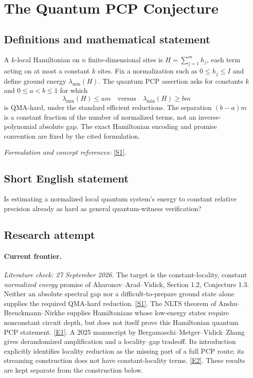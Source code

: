 \documentclass[11pt,a4paper]{article}
\newcommand{\sref}[2]{\hyperlink{source:#1:#2}{[S#2]}}
\newcommand{\eref}[2]{\hyperlink{extra:#1:#2}{[E#2]}}
\newif\ifshowcatalogue
\newcommand{\cataloguescope}[1]{\ifshowcatalogue
 \paragraph{Exact scope in the supplied catalogue.}
 \begin{quote}\small #1\end{quote}\fi}
\numberwithin{equation}{section}
\begin{document}
\setcounter{section}{0}
\clearpage
\section*{\texorpdfstring{The Quantum PCP Conjecture}{The Quantum PCP Conjecture}}\label{statement}
\subsection{Definitions and mathematical statement}
A $k$-local Hamiltonian on $n$ finite-dimensional sites is $H=\sum_{j=1}^m h_j$, each term acting on at most a constant $k$ sites. Fix a normalization such as $0\le h_j\le I$ and define ground energy $\lambda_{\min}(H)$. The quantum PCP assertion asks for constants $k$ and $0\le a<b\le1$ for which
\[
 \lambda_{\min}(H)\le am\quad\text{versus}\quad\lambda_{\min}(H)\ge bm
\]
is QMA-hard, under the standard efficient reductions. The separation $(b-a)m$ is a constant fraction of the number of normalized terms, not an inverse-polynomial absolute gap. The exact Hamiltonian encoding and promise convention are fixed by the cited formulation.
\par\smallskip\textit{Formulation and concept references:} \sref{statement}{1}.
\cataloguescope{Prove or disprove that approximating the ground-state energy of a local Hamiltonian to within a constant additive fraction of its number of local terms is QMA-hard.}
\subsection{Short English statement}
Is estimating a normalized local quantum system's energy to constant relative precision already as hard as general quantum-witness verification?
\subsection{Research attempt}
\paragraph{Current frontier.}
\textit{Literature check: 27 September 2026.}
The target is the constant-locality, constant \emph{normalized energy}
promise of Aharonov--Arad--Vidick, Section 1.2, Conjecture 1.3.
Neither an absolute spectral gap nor a difficult-to-prepare ground state
alone supplies the required QMA-hard reduction. \sref{statement}{1}.
The NLTS theorem of Anshu--Breuckmann--Nirkhe supplies Hamiltonians whose
low-energy states require nonconstant circuit depth, but does not itself
prove this Hamiltonian quantum PCP statement. \eref{statement}{1}.
A 2025 manuscript by Bergamaschi--Metger--Vidick--Zhang gives derandomized
amplification and a locality--gap tradeoff. Its introduction explicitly
identifies locality reduction as the missing part of a full PCP route;
its streaming construction does not have constant-locality terms.
\eref{statement}{2}. These results are kept separate from the construction below.
\end{document}
